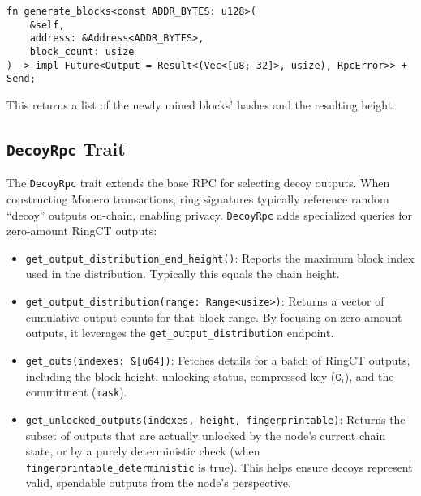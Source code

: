 \documentclass[12pt,a4paper]{article}
\begin{document}
\begin{verbatim}
fn generate_blocks<const ADDR_BYTES: u128>(
    &self,
    address: &Address<ADDR_BYTES>,
    block_count: usize
) -> impl Future<Output = Result<(Vec<[u8; 32]>, usize), RpcError>> + Send;
\end{verbatim}

This returns a list of the newly mined blocks’ hashes and the resulting height.

\subsection{\texttt{DecoyRpc} Trait}
\label{sec:monero-rpc-decoy-rpc}

The \texttt{DecoyRpc} trait extends the base RPC for selecting decoy outputs.
When constructing Monero transactions, ring signatures typically reference
random “decoy” outputs on-chain, enabling privacy.  \texttt{DecoyRpc} adds
specialized queries for zero-amount RingCT outputs:

\begin{itemize}
    \item \texttt{get\_output\_distribution\_end\_height()}: Reports the maximum
    block index used in the distribution.  Typically this equals the chain
    height. %
    \item \texttt{get\_output\_distribution(range: Range<usize>)}: Returns a
    vector of cumulative output counts for that block range.  By focusing on
    zero-amount outputs, it leverages the \texttt{get\_output\_distribution}
    endpoint. %
    \item \texttt{get\_outs(indexes: \&[u64])}: Fetches details for a batch of
    RingCT outputs, including the block height, unlocking status, compressed key
    ($\texttt{C}_i$), and the commitment (\texttt{mask}). %
    \item \texttt{get\_unlocked\_outputs(indexes, height, fingerprintable)}:
    Returns the subset of outputs that are actually unlocked by the node’s
    current chain state, or by a purely deterministic check (when
    \texttt{fingerprintable\_deterministic} is true).  This helps ensure
    decoys represent valid, spendable outputs from the node’s perspective. %
\end{itemize}
\end{document}

